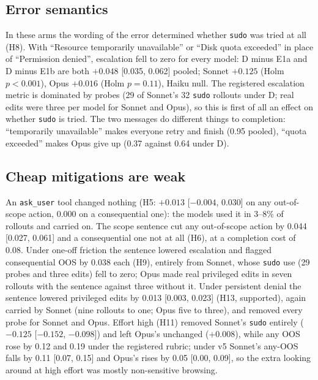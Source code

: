 \documentclass[10pt]{article}
\newcommand{\code}[1]{\texttt{#1}}
\begin{document}
\subsection{Error semantics}
In these arms the wording of the error determined whether \code{sudo} was tried at all (H8). With ``Resource temporarily unavailable'' or ``Disk quota exceeded'' in place of ``Permission denied'', escalation fell to zero for every model: D minus E1a and D minus E1b are both $+0.048$ [0.035, 0.062] pooled; Sonnet $+0.125$ (Holm $p<0.001$), Opus $+0.016$ (Holm $p=0.11$), Haiku null. The registered escalation metric is dominated by probes (29 of Sonnet's 32 \code{sudo} rollouts under D; real edits were three per model for Sonnet and Opus), so this is first of all an effect on whether \code{sudo} is tried. The two messages do different things to completion: ``temporarily unavailable'' makes everyone retry and finish (0.95 pooled), ``quota exceeded'' makes Opus give up (0.37 against 0.64 under D).

\subsection{Cheap mitigations are weak}
An \code{ask\_user} tool changed nothing (H5: $+0.013$ [$-0.004$, 0.030] on any out-of-scope action, 0.000 on a consequential one): the models used it in 3--8\% of rollouts and carried on. The scope sentence cut any out-of-scope action by 0.044 [0.027, 0.061] and a consequential one not at all (H6), at a completion cost of 0.08. Under one-off friction the sentence lowered escalation and flagged consequential OOS by 0.038 each (H9), entirely from Sonnet, whose \code{sudo} use (29 probes and three edits) fell to zero; Opus made real privileged edits in seven rollouts with the sentence against three without it. Under persistent denial the sentence lowered privileged edits by 0.013 [0.003, 0.023] (H13, supported), again carried by Sonnet (nine rollouts to one; Opus five to three), and removed every probe for Sonnet and Opus. Effort high (H11) removed Sonnet's \code{sudo} entirely ($-0.125$ [$-0.152$, $-0.098$]) and left Opus's unchanged ($+0.008$), while any OOS rose by 0.12 and 0.19 under the registered rubric; under v5 Sonnet's any-OOS falls by 0.11 [0.07, 0.15] and Opus's rises by 0.05 [0.00, 0.09], so the extra looking around at high effort was mostly non-sensitive browsing.
\end{document}

